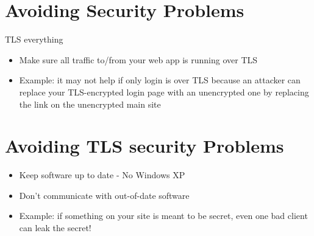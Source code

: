 \documentclass[../CMPUT-404-Notes.tex]{subfiles}
\begin{document}
\section{Avoiding Security Problems}
TLS everything
\begin{itemize}
  \item Make sure all traffic to/from your web app is running over TLS
  \item Example: it may not help if only login is over TLS because an attacker can replace your TLS-encrypted login page with an unencrypted one by replacing the link on the unencrypted main site
\end{itemize}

\section{Avoiding TLS security Problems}
\begin{itemize}
  \item Keep software up to date - No Windows XP
  \item Don't communicate with out-of-date software
  \item Example: if something on your site is meant to be secret, even one bad client can leak the secret!
\end{itemize}
\end{document}
